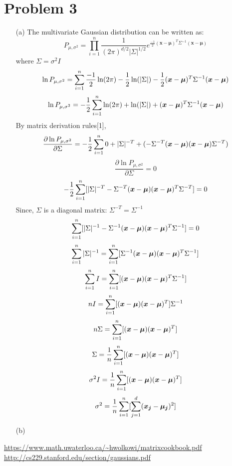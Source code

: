 \documentclass[fleqn]{article}
\begin{document}
\section{Problem 3}{}
\begin{itemize}
        \item[(a)]
		The multivariate Gaussian distribution can be written as:
		\[
			P_{\mu, \sigma^2} = \prod_{i = 1}^{n} \frac{1}{(2 \pi)^{d/2} |\Sigma|^{1/2}} e^{\frac{-1}{2} (\bm{x} - \bm{\mu})^T \Sigma^{-1} (\bm{x} - \bm{\mu}) }
		\]
		where $\Sigma = \sigma^2 I$
		\[
			\ln P_{\mu, \sigma^2} = 
			\smashoperator{\sum_{i = 1}^{n}} 
				\frac{-1}{2} \ln(2\pi) 
				- \frac{1}{2} \ln(|\Sigma|) 
				- \frac{1}{2} (\bm{x} - \bm{\mu})^T \Sigma^{-1} (\bm{x} - \bm{\mu})
		\]
		\[
			\ln P_{\mu, \sigma^2} = 
			- \frac{1}{2} \smashoperator{\sum_{i = 1}^{n}} 
				\ln(2\pi) 
				+ \ln(|\Sigma|) 
				+ (\bm{x} - \bm{\mu})^T \Sigma^{-1} (\bm{x} - \bm{\mu})
		\]
		By matrix derivation rules[1],
		\[
			\frac{\partial \ln P_{\mu, \sigma^2}}{\partial \Sigma} = 
			- \frac{1}{2} \smashoperator{\sum_{i = 1}^{n}} 
				0 + |\Sigma|^{-T} 
				+ (- \Sigma^{-T}(\bm{x} - \bm{\mu}) (\bm{x} - \bm{\mu}) \Sigma^{-T})
		\]
		\[
			\frac{\partial \ln P_{\mu, \sigma^2}}{\partial \Sigma} = 0
		\]
		\[
			- \frac{1}{2} \smashoperator{\sum_{i = 1}^{n}} 
			[ |\Sigma|^{-T} 
			- \Sigma^{-T}(\bm{x} - \bm{\mu}) (\bm{x} - \bm{\mu})^T \Sigma^{-T} ]
			= 0
		\]
		Since, $\Sigma$ is a diagonal matrix: $\Sigma^{-T} = \Sigma^{-1}$
		\[
			\smashoperator{\sum_{i = 1}^{n}} 
			[ |\Sigma|^{-1} 
			- \Sigma^{-1}(\bm{x} - \bm{\mu}) (\bm{x} - \bm{\mu})^T \Sigma^{-1} ]
			= 0
		\]
		\[
			\smashoperator{\sum_{i = 1}^{n}} |\Sigma|^{-1} =
			\smashoperator{\sum_{i = 1}^{n}} 
			[ \Sigma^{-1}(\bm{x} - \bm{\mu}) (\bm{x} - \bm{\mu})^T \Sigma^{-1} ]
		\]
		\[
			\smashoperator{\sum_{i = 1}^{n}} I =
			\smashoperator{\sum_{i = 1}^{n}} 
			[ (\bm{x} - \bm{\mu}) (\bm{x} - \bm{\mu})^T \Sigma^{-1} ]
		\]
		\[
			nI =
			\smashoperator{\sum_{i = 1}^{n}} [ (\bm{x} - \bm{\mu}) (\bm{x} - \bm{\mu})^T] \Sigma^{-1}
		\]
		\[
			n\Sigma =
			\smashoperator{\sum_{i = 1}^{n}} [ (\bm{x} - \bm{\mu}) (\bm{x} - \bm{\mu})^T ]
		\]
		\[
			\Sigma = \frac{1}{n} \smashoperator{\sum_{i = 1}^{n}} [ (\bm{x} - \bm{\mu}) (\bm{x} - \bm{\mu})^T ]
		\]
		\[
			\sigma^2 I = \frac{1}{n} \smashoperator{\sum_{i = 1}^{n}} [ (\bm{x} - \bm{\mu}) (\bm{x} - \bm{\mu})^T ]
		\]
 		\[
			\sigma^2 = \frac{1}{n} \smashoperator{\sum_{i = 1}^{n}} [\smashoperator{\sum_{j = 1}^{d}} (\bm{x_j} - \bm{\mu_j})^2]
		\]
        \item[(b)]
\end{itemize}

\begin{thebibliography}{99}
        \bibitem{[1]} \url{https://www.math.uwaterloo.ca/~hwolkowi/matrixcookbook.pdf}
        \bibitem{[2]} \url{http://cs229.stanford.edu/section/gaussians.pdf}

\end{thebibliography}
\end{document}
